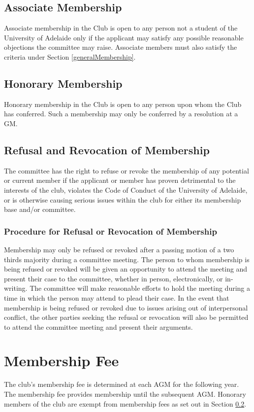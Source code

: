 \documentclass[11pt]{article}
\begin{document}
\subsection{Associate Membership} \label{associateMembership}
Associate membership in the Club is open to any person not a student of the University of Adelaide only if the applicant may satisfy any possible reasonable objections the committee may raise. Associate members must also satisfy the criteria under Section \ref{generalMembership}.

\subsection{Honorary Membership} \label{honoraryMembership}
Honorary membership in the Club is open to any person upon whom the Club has conferred. Such a membership may only be conferred by a resolution at a GM.

\subsection{Refusal and Revocation of Membership} \label{refusalRevocationMembership}
The committee has the right to refuse or revoke the membership of any potential or current member if the applicant or member has proven detrimental to the interests of the club, violates the Code of Conduct of the University of Adelaide, or is otherwise causing serious issues within the club for either its membership base and/or committee.

\subsubsection{Procedure for Refusal or Revocation of Membership} \label{procedureRefusalRevocationMembership}
Membership may only be refused or revoked after a passing motion of a two thirds majority during a committee meeting. The person to whom membership is being refused or revoked will be given an opportunity to attend the meeting and present their case to the committee, whether in person, electronically, or in-writing. The committee will make reasonable efforts to hold the meeting during a time in which the person may attend to plead their case.
In the event that membership is being refused or revoked due to issues arising out of interpersonal conflict, the other parties seeking the refusal or revocation will also be permitted to attend the committee meeting and present their arguments.

\section{Membership Fee}\label{membershipFee}
The club’s membership fee is determined at each AGM for the following year. The membership fee provides membership until the subsequent AGM. Honorary members of the club are exempt from membership fees as set out in Section \ref{honoraryMembership}.
\end{document}

